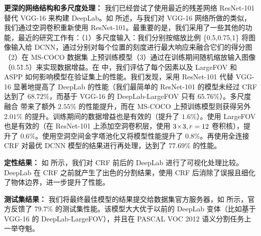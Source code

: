 \textbf{更深的网络结构和多尺度处理：} 
我们已经尝试了使用最近的残差网络 ResNet-101 \cite{he2015deep} 替代 VGG-16 来构建 DeepLab。如  所述，与我们对 VGG-16 网络所做的类似，我们通过空洞卷积重新使用 ResNet-101。最重要的是，我们采用了一些其他的功能，最近的研究工作有：\cite{farabet2013learning,  papandreou2015weakly, zheng2015conditional, liu2015semantic, lin2015efficient, chen2015attention, kokkinos2016pushing}（1）多尺度输入：我们分别按缩放比例 \{0.5,0.75,1\} 将图像输入给 DCNN，通过分别对每个位置的刻度进行最大响应来融合它们的得分图 \cite{chen2015attention}（2）在 MS-COCO 数据集 \cite{lin2014microsoft} 上预训练模型（3）通过在训练期间随机缩放输入图像（0.5\~1.5）来实现数据增益。在  中，我们评估了每个因素以及 LargeFOV 和　ASPP 如何影响模型在验证集上的性能。我们发现，采用 ResNet-101 代替 VGG-16 显著地提高了 DeepLab 的性能（我们最简单的 ResNet-101 的模型未经过 CRF 达到了 $68.72\%$，而基于 VGG-16 的 DeepLab-LargeFOV 只有 $65.76\%$）。多尺度融合 \cite{chen2015attention} 带来了额外 $2.55\%$ 的性能提升，而在 MS-COCO 上预训练模型则获得另外 $2.01\%$ 的提升。训练期间的数据增益也是有效的（提升了 $1.6\%$）。使用 LargeFOV 也是有效的（在 ResNet-101 上添加空洞卷积层，使用 $3 \! \times \! 3, r=12$ 卷积核），提升了 $0.6\%$。使用空洞空间金字塔池化又将模型性能提升了 $0.8\%$。再使用全连接 CRF 对最优 DCNN 模型的结果进行再处理，达到了 $77.69\%$ 的性能。

\textbf{定性结果：} 如  所示，我们对 CRF 前后的 DeepLab 进行了可视化处理比较。DeepLab 在 CRF 之前就产生了出色的分割结果，使用 CRF 后消除了误报且细化了物体边界，进一步提升了性能。

\textbf{测试集结果：} 我们将最终最佳模型的结果提交给数据集官方服务器，如  所示，官方反馈了 $79.7\%$ 的测试集性能。该模型大大优于以前的 DeepLab 变体（比如基于 VGG-16 的 DeepLab-LargeFOV），并且在 PASCAL VOC 2012 语义分割任务上一举夺魁。

